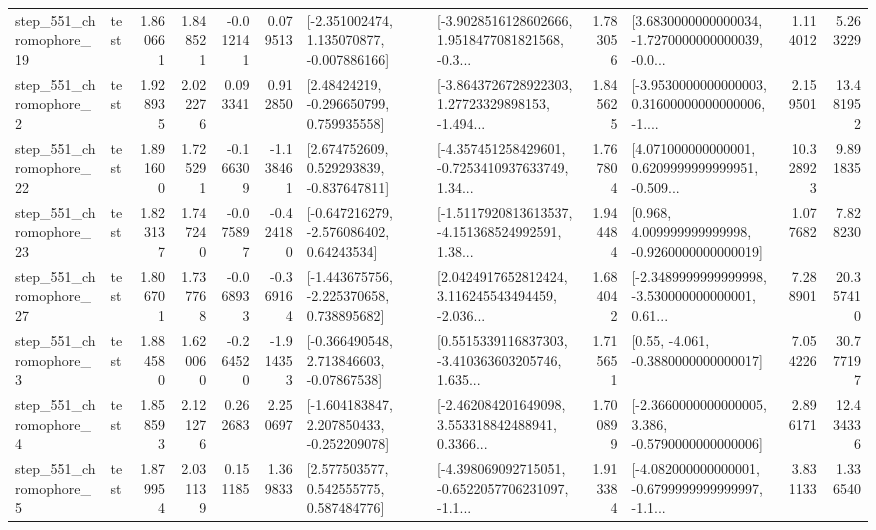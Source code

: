 \begin{tabular}{llrrrrllrlrr}
  step\_551\_chromophore\_19 &      test &      1.860661 &    1.848521 &     -0.012141 &  0.079513 &   [-2.351002474, 1.135070877, -0.007886166] &  [-3.9028516128602666, 1.9518477081821568, -0.3... &       1.783056 &  [3.6830000000000034, -1.7270000000000039, -0.0... &            1.114012 &          5.263229 \\
   step\_551\_chromophore\_2 &      test &      1.928935 &    2.022276 &      0.093341 &  0.912850 &     [2.48424219, -0.296650799, 0.759935558] &  [-3.8643726728922303, 1.27723329898153, -1.494... &       1.845625 &  [-3.9530000000000003, 0.31600000000000006, -1.... &            2.159501 &         13.481952 \\
  step\_551\_chromophore\_22 &      test &      1.891600 &    1.725291 &     -0.166309 & -1.138461 &    [2.674752609, 0.529293839, -0.837647811] &  [-4.357451258429601, -0.7253410937633749, 1.34... &       1.767804 &  [4.071000000000001, 0.6209999999999951, -0.509... &           10.328923 &          9.891835 \\
  step\_551\_chromophore\_23 &      test &      1.823137 &    1.747240 &     -0.075897 & -0.424180 &    [-0.647216279, -2.576086402, 0.64243534] &  [-1.5117920813613537, -4.151368524992591, 1.38... &       1.944484 &    [0.968, 4.009999999999998, -0.9260000000000019] &            1.077682 &          7.828230 \\
  step\_551\_chromophore\_27 &      test &      1.806701 &    1.737768 &     -0.068933 & -0.369164 &   [-1.443675756, -2.225370658, 0.738895682] &  [2.0424917652812424, 3.116245543494459, -2.036... &       1.684042 &  [-2.3489999999999998, -3.530000000000001, 0.61... &            7.288901 &         20.357410 \\
   step\_551\_chromophore\_3 &      test &      1.884580 &    1.620060 &     -0.264520 & -1.914353 &    [-0.366490548, 2.713846603, -0.07867538] &  [0.5515339116837303, -3.410363603205746, 1.635... &       1.715651 &                [0.55, -4.061, -0.3880000000000017] &            7.054226 &         30.777197 \\
   step\_551\_chromophore\_4 &      test &      1.858593 &    2.121276 &      0.262683 &  2.250697 &   [-1.604183847, 2.207850433, -0.252209078] &  [-2.462084201649098, 3.553318842488941, 0.3366... &       1.700899 &  [-2.3660000000000005, 3.386, -0.5790000000000006] &            2.896171 &         12.434336 \\
   step\_551\_chromophore\_5 &      test &      1.879954 &    2.031139 &      0.151185 &  1.369833 &     [2.577503577, 0.542555775, 0.587484776] &  [-4.398069092715051, -0.6522057706231097, -1.1... &       1.913384 &  [-4.082000000000001, -0.6799999999999997, -1.1... &            3.831133 &          1.336540 \\

\end{tabular}
